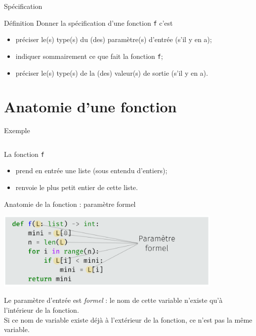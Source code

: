 \documentclass[10pt]{beamer}
\begin{document}
    \begin{frame}{Spécification}
        \begin{block}{Définition}
            Donner la spécification d'une fonction \texttt{f} c'est\pause
            \begin{itemize}
                \item	préciser le(s) type(s) du (des) paramètre(s) d'entrée (s'il y en a);\pause
                \item	indiquer sommairement ce que fait la fonction \texttt{f};\pause
                \item 	préciser le(s) type(s) de la (des) valeur(s) de sortie (s'il y en a).
            \end{itemize}
        \end{block}
    \end{frame}
    \section{Anatomie d'une fonction}
    \begin{frame}[fragile]{Exemple}
            \inputminted{python}{scripts/min.py}\pause
        La fonction \texttt{f}
        \begin{itemize}
            \item	prend en entrée une liste (sous entendu d'entiers);\pause
            \item	renvoie le plus petit entier de cette liste.
        \end{itemize}
    \end{frame}
    \begin{frame}{Anatomie de la fonction : paramètre formel}
        \begin{center}
            \includegraphics[width=11cm]{img/anat1}
        \end{center}\pause
    Le paramètre d'entrée est \textit{formel} : \alert{le nom de cette variable n'existe qu'à l'intérieur de la fonction}.\\\pause
    Si ce nom de variable existe déjà à l'extérieur de la fonction, \alert{ce n'est pas la même variable}.
    \end{frame}
\end{document}
